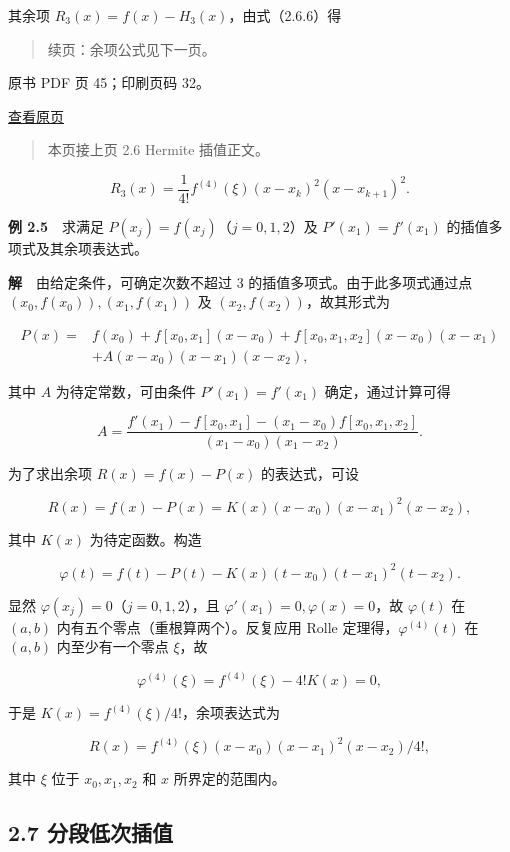 其余项 \(R_3(x)=f(x)-H_3(x)\)，由式（2.6.6）得

\begin{quote}
续页：余项公式见下一页。
\end{quote}

\clearpage

原书 PDF 页 45；印刷页码 32。

\href{source-images/pdf-045.jpeg}{查看原页}

\begin{quote}
本页接上页 2.6 Hermite 插值正文。
\end{quote}

\[R_3(x)=\frac{1}{4!}f^{(4)}(\xi)(x-x_k)^2(x-x_{k+1})^2.\]

\textbf{例 2.5}　求满足 \(P(x_j)=f(x_j)\)（\(j=0,1,2\)）及 \(P'(x_1)=f'(x_1)\) 的插值多项式及其余项表达式。

\textbf{解}　由给定条件，可确定次数不超过 3 的插值多项式。由于此多项式通过点 \((x_0,f(x_0)),(x_1,f(x_1))\) 及 \((x_2,f(x_2))\)，故其形式为

\[\begin{aligned}
P(x)={}&f(x_0)+f[x_0,x_1](x-x_0)+f[x_0,x_1,x_2](x-x_0)(x-x_1)\\
&+A(x-x_0)(x-x_1)(x-x_2),
\end{aligned}\]

其中 \(A\) 为待定常数，可由条件 \(P'(x_1)=f'(x_1)\) 确定，通过计算可得

\[A=\frac{f'(x_1)-f[x_0,x_1]-(x_1-x_0)f[x_0,x_1,x_2]}{(x_1-x_0)(x_1-x_2)}.\]

为了求出余项 \(R(x)=f(x)-P(x)\) 的表达式，可设

\[R(x)=f(x)-P(x)=K(x)(x-x_0)(x-x_1)^2(x-x_2),\]

其中 \(K(x)\) 为待定函数。构造

\[\varphi(t)=f(t)-P(t)-K(x)(t-x_0)(t-x_1)^2(t-x_2).\]

显然 \(\varphi(x_j)=0\)（\(j=0,1,2\)），且 \(\varphi'(x_1)=0,\varphi(x)=0\)，故 \(\varphi(t)\) 在 \((a,b)\) 内有五个零点（重根算两个）。反复应用 Rolle 定理得，\(\varphi^{(4)}(t)\) 在 \((a,b)\) 内至少有一个零点 \(\xi\)，故

\[\varphi^{(4)}(\xi)=f^{(4)}(\xi)-4!K(x)=0,\]

于是 \(K(x)=f^{(4)}(\xi)/4!\)，余项表达式为

\[R(x)=f^{(4)}(\xi)(x-x_0)(x-x_1)^2(x-x_2)/4!,\tag{2.6.11}\]

其中 \(\xi\) 位于 \(x_0,x_1,x_2\) 和 \(x\) 所界定的范围内。

\subsection{2.7 分段低次插值}\label{ch02b-ux5206ux6bb5ux4f4eux6b21ux63d2ux503c}


